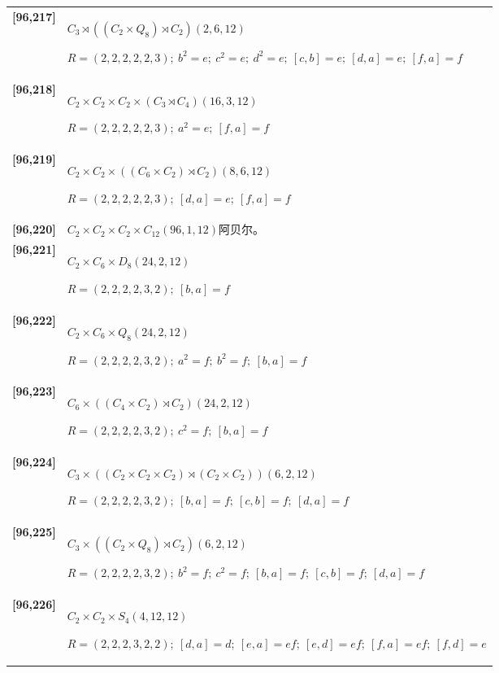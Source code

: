 \documentclass[UTF8,fontset=fandol,11pt,a4paper]{ctexart}
\begin{document}
\begin{longtable}{@{}p{17mm}>{\raggedright\arraybackslash}p{141mm}@{}}
\textbf{[96,217]} & $C_{3}\rtimes ((C_{2}\times Q_{8})\rtimes C_{2})$\quad $(2,6,12)$\par\(R=(2,2,2,2,2,3);\allowbreak\ b^{2}=e;\allowbreak\ c^{2}=e;\allowbreak\ d^{2}=e;\allowbreak\ [c,b]=e;\allowbreak\ [d,a]=e;\allowbreak\ [f,a]=f\)\\[3pt]

\textbf{[96,218]} & $C_{2}\times C_{2}\times C_{2}\times (C_{3}\rtimes C_{4})$\quad $(16,3,12)$\par\(R=(2,2,2,2,2,3);\allowbreak\ a^{2}=e;\allowbreak\ [f,a]=f\)\\[3pt]

\textbf{[96,219]} & $C_{2}\times C_{2}\times ((C_{6}\times C_{2})\rtimes C_{2})$\quad $(8,6,12)$\par\(R=(2,2,2,2,2,3);\allowbreak\ [d,a]=e;\allowbreak\ [f,a]=f\)\\[3pt]

\textbf{[96,220]} & $C_{2}\times C_{2}\times C_{2}\times C_{12}$\quad $(96,1,12)$\quad 阿贝尔。\\[3pt]

\textbf{[96,221]} & $C_{2}\times C_{6}\times D_{8}$\quad $(24,2,12)$\par\(R=(2,2,2,2,3,2);\allowbreak\ [b,a]=f\)\\[3pt]

\textbf{[96,222]} & $C_{2}\times C_{6}\times Q_{8}$\quad $(24,2,12)$\par\(R=(2,2,2,2,3,2);\allowbreak\ a^{2}=f;\allowbreak\ b^{2}=f;\allowbreak\ [b,a]=f\)\\[3pt]

\textbf{[96,223]} & $C_{6}\times ((C_{4}\times C_{2})\rtimes C_{2})$\quad $(24,2,12)$\par\(R=(2,2,2,2,3,2);\allowbreak\ c^{2}=f;\allowbreak\ [b,a]=f\)\\[3pt]

\textbf{[96,224]} & $C_{3}\times ((C_{2}\times C_{2}\times C_{2})\rtimes (C_{2}\times C_{2}))$\quad $(6,2,12)$\par\(R=(2,2,2,2,3,2);\allowbreak\ [b,a]=f;\allowbreak\ [c,b]=f;\allowbreak\ [d,a]=f\)\\[3pt]

\textbf{[96,225]} & $C_{3}\times ((C_{2}\times Q_{8})\rtimes C_{2})$\quad $(6,2,12)$\par\(R=(2,2,2,2,3,2);\allowbreak\ b^{2}=f;\allowbreak\ c^{2}=f;\allowbreak\ [b,a]=f;\allowbreak\ [c,b]=f;\allowbreak\ [d,a]=f\)\\[3pt]

\textbf{[96,226]} & $C_{2}\times C_{2}\times S_{4}$\quad $(4,12,12)$\par\(R=(2,2,2,3,2,2);\allowbreak\ [d,a]=d;\allowbreak\ [e,a]=ef;\allowbreak\ [e,d]=ef;\allowbreak\ [f,a]=ef;\allowbreak\ [f,d]=e\)\\[3pt]


\end{longtable}
\end{document}
